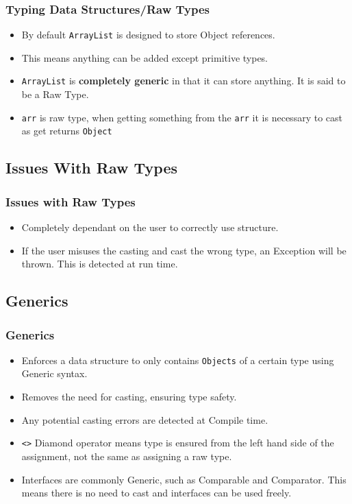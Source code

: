 \documentclass{beamer}
\begin{document}
\begin{frame}
\frametitle{Typing Data Structures/Raw Types}
\arr
\begin{itemize}
\item By default \texttt{ArrayList} is designed to store Object references.
\item This means anything can be added except primitive types.
\item \texttt{ArrayList} is \textbf{completely generic} in that it can store anything. It is said to be a {\color{red} Raw Type}.
\end{itemize}
\arrTwo
\begin{itemize}
\item \texttt{arr} is {\color{red} raw type}, when getting something from the \texttt{arr} it is necessary to cast as get returns \texttt{Object}
\end{itemize}
\end{frame}

\subsection{Issues With Raw Types}
\begin{frame}
\frametitle{Issues with Raw Types}
\begin{itemize}
\item Completely dependant on the user to correctly use structure.
\item If the user misuses the casting and cast the wrong type, an Exception will be thrown. This is detected at {\color{red} run time}.
\end{itemize}
\end{frame}
\subsection{Generics}
\begin{frame}
\frametitle{Generics}
\begin{itemize}
\item Enforces a data structure to only contains \texttt{Objects} of a certain type using Generic syntax.
\item Removes the need for casting, ensuring {\color{green} type safety}.
\item Any potential casting errors are detected at {\color{red} Compile time}.
\item \texttt{<>} Diamond operator means type is ensured from the left hand side of the assignment, not the same as assigning a {\color{purple} raw type}.
\item Interfaces are commonly Generic, such as {\color{blue} Comparable} and {\color{orange} Comparator}. This means there is no need to cast and interfaces can be used freely.
\end{itemize}
\end{frame}
\end{document}
